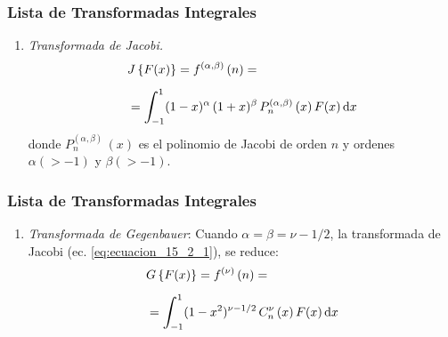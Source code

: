 \documentclass[12pt]{beamer}
\begin{document}
\begin{frame}
\frametitle{Lista de Transformadas Integrales}
\begin{enumerate}[<+->]
\conti
\item \emph{Transformada de Jacobi.}
\begin{align}
\begin{aligned}
&J \left\{ F (x) \right\} = f^{(\alpha, \beta)} \, (n) = \\[0.5em]
&= \scaleint{6ex}_{\bs -1}^{1} (1 - x)^{\alpha} \, (1 + x)^{\beta} \, P_{n}^{(\alpha, \beta)} \, (x) \, F (x) \dd{x}
\end{aligned}
\label{eq:ecuacion_15_2_1}
\end{align}
donde $P_{n}^{(\alpha, \beta)} \, (x)$ es el polinomio de Jacobi de orden $n$ y ordenes $\alpha (> -1)$ y $\beta (> -1)$.
\seti
\end{enumerate}
\end{frame}
\begin{frame}
\frametitle{Lista de Transformadas Integrales}
\begin{enumerate}[<+->]
\conti
\item \emph{Transformada de Gegenbauer}: \pause Cuando $\alpha = \beta = \nu - 1/2$, la transformada de Jacobi (ec. \ref{eq:ecuacion_15_2_1}), se reduce:
\pause
\begin{align}
\begin{aligned}[b]
&G \left\{ F (x) \right\} = f^{(\nu)} \, (n) = \\[0.5em]
&= \scaleint{6ex}_{\bs -1}^{1} (1 - x^{2})^{\nu - 1/2} \, C_{n}^{\nu} \, (x) \, F (x) \dd{x}
\end{aligned}
\label{eq:ecuacion_15_2_4}
\end{align}
\seti
\end{enumerate}
\end{frame}
\end{document}
